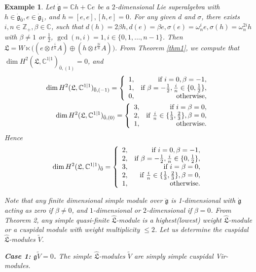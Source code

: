 \documentclass[1p]{elsarticle}
\numberwithin{equation}{section}
\def\dg{\dot{\mathfrak{g}}}
\def\ddg{\ddot{\mathfrak{g}}}
\def\fL{\mathfrak{L}}
\def\bC{\mathbb{C}}
\def\bZ{\mathbb{Z}}
\def\hL{\hat{\fL}}
\newtheorem{exam}{Example}
\begin{document}
\begin{exam} Let $\dg=\bC h+\bC e$ be a $2$-dimensional Lie superalgebra with $h\in \dg_{\bar 0}, e\in \dg_{\bar 1}$, and $h=[e,e], [h,e]=0$. For any given $d$ and $\sigma$, there exists 
$i,n\in \bZ_+, \beta\in \bC$, such that $d(h)=2\beta h,d(e)=\beta e, \sigma(e)=\omega_n^{i} e, \sigma(h)=\omega_n^{2i} h$ with $\beta\ne 1$ or $\frac 12$,  $\gcd(n,i)=1, i\in \{0,1,\ldots,n-1\}$. Then $\fL=W\ltimes \big((e\otimes t^{\frac in}A)\oplus (h\otimes t^{\frac {2i}n}A)\big)$. From Theorem \ref{thm1}, we compute that $\dim H^2(\fL,\bC^{1|1})_{\bar 0,(1)}=0$, and 
	$$\begin{aligned}
\dim H^2(\fL,\bC^{1|1})_{\bar 0,(-1)}=\left\{\begin{array}{lr}1,& \text{\rm if }i=0,\beta=-1,\\1,& \text{\rm if }\beta=-\frac 12,\frac in\in\{0,\frac 12\},\\ 0, &{\rm otherwise}, \end{array}\right. \\
\dim H^2(\fL,\bC^{1|1})_{\bar 0,(0)}=\left\{\begin{array}{lr}3,& \text{\rm if }i=\beta=0,\\ 2,& \text{\rm if }\frac in\in\{\frac 13,\frac 23\},\beta=0,\\ 1,  &{\rm otherwise}. \end{array}\right.\end{aligned}$$ 
Hence 
\begin{equation*} \dim H^2(\fL,\bC^{1|1})_{\bar 0}=\left\{\begin{array}{lr}2,&\text{\rm if } i=0,\beta=-1,\\2,&\text{\rm if }\beta=-\frac 12,\frac in\in\{0,\frac 12\},\\3,& \text{\rm if }i=\beta=0,\\ 2,& \text{\rm if }\frac in\in\{\frac 13,\frac 23\},\beta=0,\\ 1,  &{\rm otherwise}.\end{array}\right.\end{equation*}

Note that any finite dimensional simple module over $\ddg$ is 1-dimensional with $\dg$ acting as zero if  $\beta\ne 0$, and $1$-dimensional or $2$-dimensional if $\beta=0$.
  From Theorem 2, any simple quasi-finite $\hL$-module is a highest(lowest) weight $\hL$-module or a cuspidal module with weight multiplicity $\le 2$. 
  Let us determine the cuspidal $\hL$-modules $\tilde V$. 
  
  	{\bf Case 1: $\mathfrak{g} \tilde V=0$.} The simple $\hL$-modules $\tilde V$  are simply simple cuspidal Vir-modules.
  

\end{exam}
\end{document}
